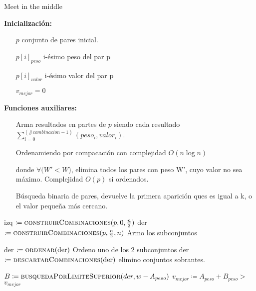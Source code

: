 \documentclass[fleqn, 11pt]{article}
\def\is{\coloneqq}
\begin{document}
\begin{algorithm}
\caption{Meet in the middle}
\begin{algorithmic}[1]
\item[\textbf{Inicialización:}]
\item[] \begin{itemize}
	\item[] $p$ conjunto de pares inicial.
	\item[] $p[i]_{peso}$ i-ésimo peso del par p
	\item[] $p[i]_{valor}$ i-ésimo valor del par p
	\item[] $v_{mejor} = 0$
\end{itemize}
\item[\textbf{Funciones auxiliares:}]
\item[] \begin{itemize}
	\item[]  Arma resultados en partes de $p$ siendo cada resultado $\sum_{i = 0}^{(\#combinacion -1)} (peso_i, valor_i)$.
	
	\item[]  Ordenamiendo por compacación con
	complejidad $O(n\log n)$
	
	\item[]  donde $\forall (W' < W$), elimina todos los pares con peso W', cuyo valor no sea máximo. Complejidad $O(p)$ si ordenados.

	\item[]  Búsqueda binaria de
	pares, devuelve la primera aparición ques es igual a k, o el valor
	pequeña más cercano.
\end{itemize}
\Statex
{}
\State izq $\is \Call{construirCombinaciones}{p, 0, \frac{n}{2}}$
\State der $\is \Call{construirCombinaciones}{p, \frac{n}{2}, n}$
\Comment Armo los subconjuntos

\State der $\is \Call{ordenar}{\text{der}}$
\Comment Ordeno uno de los 2 subconjuntos
\State der $\is \Call{descartarCombinaciones}{\text{der}}$
\Comment elimino conjuntos sobrantes.

	\State $B \is \Call{busquedaPorLimiteSuperior}{der, w - A_{peso}}$
			\State  $v_{mejor} \is A_{peso} + B_{peso} > $
		\EndIf
	\EndIf
\EndFor
\State \Return $v_{mejor}$
\EndFunction
\end{algorithmic}
\end{algorithm}
\end{document}
